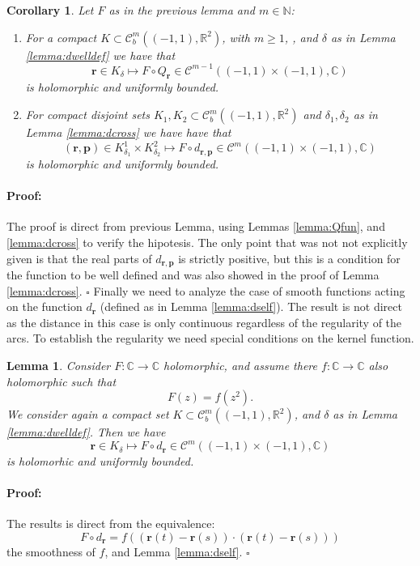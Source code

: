 \documentclass{article}
\newtheorem{lemma}[theorem]{Lemma}
\newtheorem{corollary}[theorem]{Corollary}
\newenvironment{proof}{\paragraph{Proof:}}{\hfill$\square$}
\newcommand{\IC}{{\mathbb C}}
\newcommand{\IN}{{\mathbb N}}
\newcommand{\IR}{{\mathbb R}}
\newcommand{\bp}{{\bm p}}
\newcommand{\cmspace}[3]{\mathcal{C}^{#1} \left( #2, #3 \right)}
\newcommand{\rgeo}[1]{\mathcal{C}_b^{#1}\left( (-1,1), \IR^2 \right)}
\newcommand{\br}{\bm{r}}
\begin{document}
\begin{corollary}
\label{cor:smoothcomp}
Let $F$ as in the previous lemma and $m \in \IN$: 
\begin{enumerate}
\item 
For a compact $K \subset \rgeo{m}$, with $m \geq 1$, , and $\delta$ as in Lemma \ref{lemma:dwelldef} we have that 
$$\br \in K_\delta \mapsto F \circ Q_{\br} \in \cmspace{m-1}{(-1,1)\times(-1,1)}{\IC}$$
is holomorphic and uniformly bounded. 
\item 
For compact disjoint sets $K_1,K_2 \subset  \rgeo{m}$ and $\delta_1, \delta_2$ as in Lemma \ref{lemma:dcross} we have have that 
$$(\br,\bp) \in K^1_{\delta_1} \times K^2_{\delta_2} \mapsto F \circ d_{\br,\bp} \in \cmspace{m}{(-1,1)\times(-1,1)}{\IC}$$
is holomorphic and uniformly bounded.
\end{enumerate}
\end{corollary}
\begin{proof}
The proof is direct from previous Lemma, using Lemmas \ref{lemma:Qfun}, and \ref{lemma:dcross} to verify the hipotesis. The only point that was not not explicitly given is that the real parts of $d_{\br,\bp}$ is strictly positive, but this is a condition for the function to be well defined and was also showed in the proof of Lemma \ref{lemma:dcross}.
\end{proof}
Finally we need to analyze the case of smooth functions acting on the function $d_{\br}$ (defined as in Lemma \ref{lemma:dself}). The result is not direct as the distance in this case is only continuous regardless of the regularity of the arcs. To establish the regularity we need special conditions on the kernel function. 
\begin{lemma}
\label{lemma:selfkernell}
Consider $F :\IC \rightarrow \IC$ holomorphic, and assume there $f : \IC \rightarrow \IC$ also holomorphic such that
$$F(z) = f(z^2).$$ 
We consider again a compact set $K \subset \rgeo{m}$, and $\delta$ as in Lemma \ref{lemma:dwelldef}. Then we have 
$$\br \in K_\delta \mapsto F\circ d_{\br} \in \cmspace{m}{(-1,1)\times(-1,1)}{\IC}$$
is holomorhic and uniformly bounded. 
\end{lemma}
\begin{proof}
The results is direct from the equivalence: $$F\circ d_{\br} = f( (\br(t)-\br(s)) \cdot (\br(t)-\br(s)))$$ the smoothness of $f$, and Lemma \ref{lemma:dself}. 
\end{proof}
\end{document}
